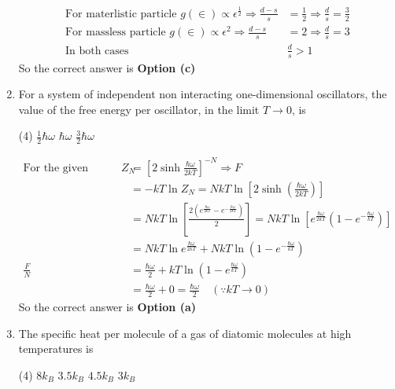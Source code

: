\begin{enumerate}
\begin{answer}
\begin{align*}
	\text{For materlistic particle }g(\in) \propto \epsilon^{\frac{1}{2}} \Rightarrow \frac{d-s}{s}&=\frac{1}{2} \Rightarrow \frac{d}{s}=\frac{3}{2}\\
	\text{For massless particle }g(\in) \propto \epsilon^{2} \Rightarrow \frac{d-s}{s}&=2 \Rightarrow \frac{d}{s}=3\\
	\text{In both cases }&\frac{d}{s}>1
	\end{align*}
	So the correct answer is \textbf{Option (c)}
\end{answer}
	\item For a system of independent non interacting one-dimensional oscillators, the value of the free energy per oscillator, in the limit $T \rightarrow 0$, is
	{}
	\begin{tasks}(4)
		\task[\textbf{a.}] $\frac{1}{2} \hbar \omega$
		\task[\textbf{b.}] $\hbar \omega$
		\task[\textbf{c.}] $\frac{3}{2} \hbar \omega$
	\end{tasks}
\begin{answer}
	\begin{align*}
	\text{For the given system }Z_{N}&=\left[2 \sinh \frac{\hbar \omega}{2 k T}\right]^{-N} \Rightarrow F\\&=-k T \ln Z_{N}=N k T \ln \left[2 \sinh \left(\frac{\hbar \omega}{2 k T}\right)\right]\\
	&=N k T \ln \left[\frac{2\left(e^{\frac{\hbar \omega}{2 k T}}-e^{-\frac{\hbar \omega}{2 k T}}\right)}{2}\right]=N k T \ln \left[e^{\frac{\hbar \omega}{2 k T}}\left(1-e^{-\frac{\hbar \omega}{k T}}\right)\right]\\&=N k T \ln e^{\frac{\hbar \omega}{2 k T}}+N k T \ln \left(1-e^{-\frac{\hbar \omega}{k T}}\right)\\
	\frac{F}{N}&=\frac{\hbar \omega}{2}+k T \ln \left(1-e^{\frac{\hbar \omega}{k T}}\right)\\&=\frac{\hbar \omega}{2}+0=\frac{\hbar \omega}{2}\quad (\because k T \rightarrow 0)
	\end{align*}
	So the correct answer is \textbf{Option (a)}
\end{answer}
	\item The specific heat per molecule of a gas of diatomic molecules at high temperatures is
	{}
	\begin{tasks}(4)
		\task[\textbf{a.}] $8 k_{B}$
		\task[\textbf{b.}] $3.5 k_{B}$
		\task[\textbf{c.}] $4.5 k_{B}$
		\task[\textbf{d.}] $3 k_{B}$
	\end{tasks}
\begin{answer}

\end{answer}
\end{enumerate}
